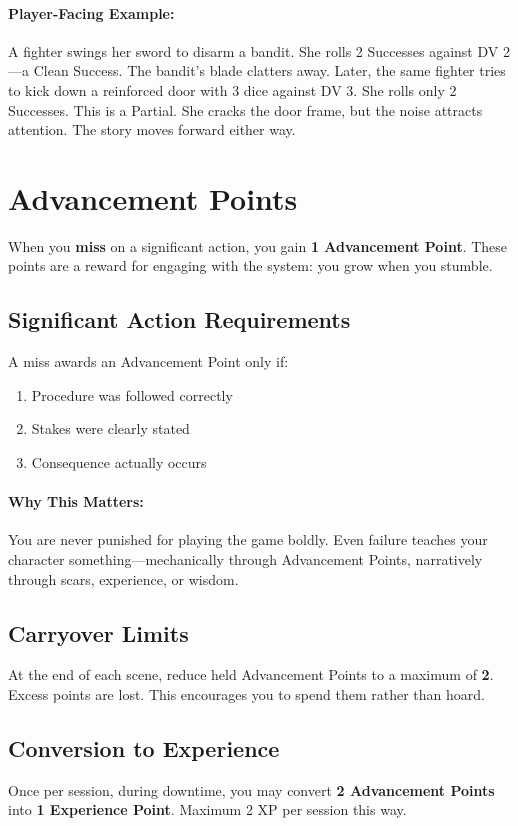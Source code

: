 \begin{multicols}{2}
\paragraph{Player-Facing Example:}  
A fighter swings her sword to disarm a bandit. She rolls 2 Successes against DV 2—a Clean Success. The bandit’s blade clatters away.  
Later, the same fighter tries to kick down a reinforced door with 3 dice against DV 3. She rolls only 2 Successes. This is a Partial. She cracks the door frame, but the noise attracts attention. The story moves forward either way.

\section{Advancement Points} 

When you \textbf{miss} on a significant action, you gain \textbf{1 Advancement Point}. These points are a reward for engaging with the system: you grow when you stumble.

\subsection*{Significant Action Requirements}
A miss awards an Advancement Point only if:
\begin{enumerate}
  \item Procedure was followed correctly
  \item Stakes were clearly stated
  \item Consequence actually occurs
\end{enumerate}

\paragraph{Why This Matters:}  
You are never punished for playing the game boldly. Even failure teaches your character something—mechanically through Advancement Points, narratively through scars, experience, or wisdom.

\subsection*{Carryover Limits}
At the end of each scene, reduce held Advancement Points to a maximum of \textbf{2}. Excess points are lost. This encourages you to spend them rather than hoard.

\subsection*{Conversion to Experience}
Once per session, during downtime, you may convert \textbf{2 Advancement Points} into \textbf{1 Experience Point}. Maximum 2 XP per session this way.


\end{multicols}
